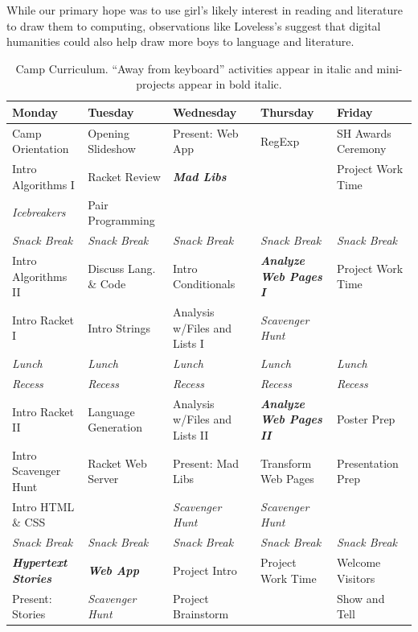 While our primary hope was to use girl's likely interest in reading
and literature to draw them to computing, observations like Loveless's
suggest that digital humanities could also help draw more boys to
language and literature.


\newcommand{\afk}[1]{\textit{#1}}
\newcommand{\proj}[1]{\textit{\textbf{#1}}}

\begin{table}[t]
\centering
\begin{tabular}{|l|l|l|l|l|}
\hline
\textbf{Monday} 	& \textbf{Tuesday} 	& \textbf{Wednesday} 	& \textbf{Thursday} 		& \textbf{Friday} \\ \hline
Camp Orientation 	& Opening Slideshow 	& Present: Web App	& RegExp 			& SH Awards Ceremony \\ \hline
Intro Algorithms I	& Racket Review		& \proj{Mad Libs}	& 				& Project Work Time \\ \hline
\afk{Icebreakers}      	& Pair Programming 	& 			& 				& \\ \hline
\afk{Snack Break} & \afk{Snack Break}	& \afk{Snack Break}	& \afk{Snack Break}	& \afk{Snack Break} \\ \hline
Intro Algorithms II	& Discuss Lang. \& Code	& Intro Conditionals	& \proj{Analyze Web Pages I}	& Project Work Time \\ \hline
Intro Racket I		& Intro Strings		& Analysis w/Files and Lists I	& \afk{Scavenger Hunt}		& \\ \hline
\afk{Lunch} & \afk{Lunch}	& \afk{Lunch}	& \afk{Lunch}	& \afk{Lunch} \\ \hline
\afk{Recess} & \afk{Recess}	& \afk{Recess}	& \afk{Recess}	& \afk{Recess} \\ \hline
Intro Racket II		& Language Generation	& Analysis w/Files and Lists II	& \proj{Analyze Web Pages II} 	& Poster Prep \\ \hline
Intro Scavenger Hunt	& Racket Web Server 	& Present: Mad Libs	& Transform Web Pages		& Presentation Prep \\ \hline
Intro HTML \& CSS 	&			& \afk{Scavenger Hunt}	& \afk{Scavenger Hunt}		& \\ \hline
\afk{Snack Break} & \afk{Snack Break}	& \afk{Snack Break}	& \afk{Snack Break}	& \afk{Snack Break} \\ \hline
\proj{Hypertext Stories}& \proj{Web App}	& Project Intro 	& Project Work Time		& Welcome Visitors \\ \hline
Present: Stories 	& \afk{Scavenger Hunt}	& Project Brainstorm	& 				& Show and Tell \\ \hline
\end{tabular}
\caption{Camp Curriculum.  ``Away from keyboard'' activities appear in italic and mini-projects appear in bold italic.}
\label{table:curriculum}
\end{table}

